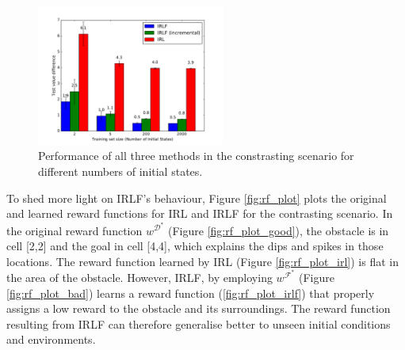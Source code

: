 \documentclass[a4paper,11pt]{report}
\begin{document}
\begin{figure}
	\centering
 	\includegraphics[clip=true,width=0.55\textwidth]{figures/data_size.pdf}
 	\caption{Performance of all three methods in the constrasting scenario for different numbers of initial states.}
 	\label{fig:data_size}
\end{figure}

To shed more light on IRLF's behaviour, Figure \ref{fig:rf_plot} plots the original and learned reward functions for IRL and IRLF for the contrasting scenario. In the original reward function $w^{\mathcal{D}^*}$ (Figure \ref{fig:rf_plot_good}), the obstacle is in cell [2,2] and the goal in cell [4,4], which explains the dips and spikes in those locations.  The reward function learned by IRL (Figure \ref{fig:rf_plot_irl}) is flat in the area of the obstacle. However, IRLF, by employing $w^{\mathcal{F}^*}$ (Figure \ref{fig:rf_plot_bad}) learns a reward function (\ref{fig:rf_plot_irlf}) that properly assigns a low reward to the obstacle and its surroundings. The reward function resulting from IRLF can therefore generalise better to unseen initial conditions and environments.
\end{document}
